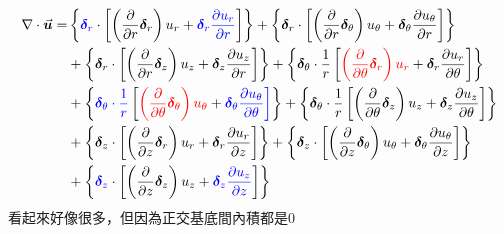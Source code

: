 \documentclass[../main.tex]{subfiles}
\begin{document}
\begin{itemize}
\begin{itemize}
\begin{enumerate}
\begin{align}
            \nabla \cdot \vec{\bm u} =& \left\{
              {\color{blue} \bm\delta_r} \cdot \left[
                \left(\frac{\partial}{\partial r}\bm\delta_r\right) u_r + {\color{blue} \bm\delta_r \frac{\partial u_r}{\partial r}}
              \right]
            \right\}  + \left\{
              \bm\delta_r \cdot \left[
                \left(\frac{\partial}{\partial r}\bm\delta_\theta\right) u_\theta + \bm\delta_\theta \frac{\partial u_\theta}{\partial r}
              \right]
            \right\} \nonumber\\
            & + \left\{
              \bm\delta_r \cdot \left[
                \left(\frac{\partial}{\partial r}\bm\delta_z\right) u_z + \bm\delta_z \frac{\partial u_z}{\partial r}
              \right]
            \right\}  + \left\{
              \bm\delta_\theta \cdot \frac{1}{r} \left[
                {\color{red}\left(\frac{\partial}{\partial \theta}\bm\delta_r\right) u_r} + \bm\delta_r \frac{\partial u_r}{\partial \theta}
              \right]
            \right\} \nonumber\\
            & +  \left\{
             \color{blue} \bm\delta_\theta \cdot \frac{1}{r} \color{black}\left[
                {\color{red}\left(\frac{\partial}{\partial \theta}\bm\delta_\theta\right) u_\theta} + \color{blue}\bm\delta_\theta \frac{\partial u_\theta}{\partial \theta}
              \right] \color{black}
            \right\} + \left\{
              \bm\delta_\theta \cdot \frac{1}{r} \left[
                \left(\frac{\partial}{\partial \theta}\bm\delta_z\right) u_z + \bm\delta_z \frac{\partial u_z}{\partial \theta}
              \right]
            \right\} \nonumber\\
            & + \left\{
              \bm\delta_z \cdot \left[
                \left(\frac{\partial}{\partial z}\bm\delta_r\right) u_r + \bm\delta_r \frac{\partial u_r}{\partial z}
              \right]
            \right\}  + \left\{
              \bm\delta_z \cdot \left[
                \left(\frac{\partial}{\partial z}\bm\delta_\theta\right) u_\theta + \bm\delta_\theta \frac{\partial u_\theta}{\partial z}
              \right]
            \right\} \nonumber\\
            & + \left\{
              {\color{blue}\bm\delta_z}\cdot \left[
                \left(\frac{\partial}{\partial z}\bm\delta_z\right) u_z + {\color{blue}\bm\delta_z \frac{\partial u_z}{\partial z}}
              \right]
            \right\}
          \end{align}
        看起來好像很多，但因為正交基底間內積都是0\\

\end{enumerate}
\end{itemize}
\end{itemize}
\end{document}
